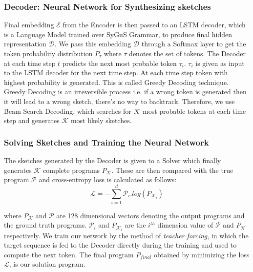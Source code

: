 \subsubsection{Decoder: Neural Network for Synthesizing sketches}
Final embedding $\mathcal{E}$ from the Encoder is then passed to an LSTM decoder, which is a Language Model trained over SyGuS Grammar, to produce final hidden representation $\mathcal{D}$. We pass this embedding $\mathcal{D}$ through a Softmax layer to get the token probability distribution $P_\tau$ where $\tau$ denotes the set of tokens. The Decoder at each time step $t$ predicts the next most probable token $\tau_i$. $\tau_i$ is given as input to the LSTM decoder for the next time step. At each time step token with highest probability is generated. This is called Greedy Decoding technique. Greedy Decoding is an irreversible process i.e. if a wrong token is generated then it will lead to a wrong sketch, there's no way to backtrack. Therefore, we use Beam Search Decoding, which searches for $\mathcal{K}$ most probable tokens at each time step and generates $\mathcal{K}$ most likely sketches.

\subsubsection{Solving Sketches and Training the Neural Network}
The sketches generated by the Decoder is given to a Solver which finally generates $\mathcal{K}$ complete programs $P_{\mathcal{K}}$. These are then compared with the true program $\mathcal{P}$ and cross-entropy loss is calculated as follows:
$$\mathcal{L} = -\sum_{i=1}^{d}\mathcal{P}_i.log(P_{\mathcal{K}_i})$$

where $P_\mathcal{K}$ and $\mathcal{P}$ are 128 dimensional vectors denoting the output programs and the ground truth programs. $\mathcal{P}_i$ and $P_{\mathcal{K}_i}$ are the $i^{th}$ dimension value of $\mathcal{P}$ and $P_\mathcal{K}$ respectively. We train our network by the method of \textit{teacher forcing}, in which the target sequence is fed to the Decoder directly during the training and used to compute the next token. The final program $P_{final}$ obtained by minimizing the loss $\mathcal{L}$, is our solution program.

